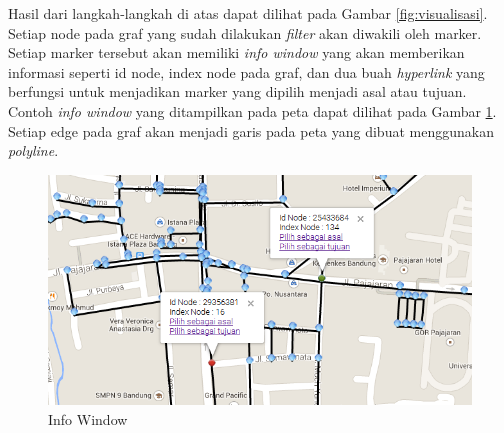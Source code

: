 Hasil dari langkah-langkah di atas dapat dilihat pada Gambar
\ref{fig:visualisasi}. Setiap node pada graf yang sudah dilakukan
\textit{filter} akan diwakili oleh marker. Setiap marker tersebut akan memiliki \textit{info
window} yang akan memberikan informasi seperti id node, index node pada graf,
dan dua buah \textit{hyperlink} yang berfungsi untuk menjadikan marker yang
dipilih menjadi asal atau tujuan. Contoh \textit{info window} yang ditampilkan
pada peta dapat dilihat pada Gambar \ref{fig:visualisasi_infowindow}. Setiap
edge pada graf akan menjadi garis pada peta yang dibuat menggunakan \textit{polyline}.
\clearpage
\begin{figure}[h]
\centering
\includegraphics[scale=0.9]{Gambar/visualisasi_infowindow}
\caption[Info Window]{Info Window}
\label{fig:visualisasi_infowindow}
\end{figure}

